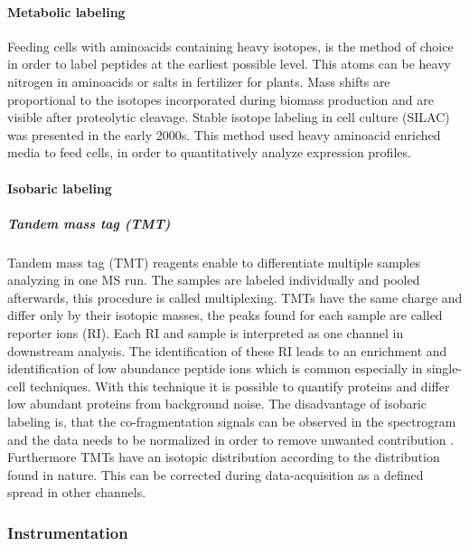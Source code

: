 \documentclass[
]{article}
\begin{document}
\hypertarget{metabolic-labeling}{%
\paragraph{Metabolic labeling}\label{metabolic-labeling}}

Feeding cells with aminoacids containing heavy isotopes, is the method
of choice in order to label peptides at the earliest possible level.
This atoms can be heavy nitrogen in aminoacids or salts in fertilizer
for plants. Mass shifts are proportional to the isotopes incorporated
during biomass production and are visible after proteolytic cleavage.
Stable isotope labeling in cell culture (SILAC) was presented in the
early 2000s. This method used heavy aminoacid enriched media to feed
cells, in order to quantitatively analyze expression profiles.

\hypertarget{isobaric-labeling}{%
\paragraph{Isobaric labeling}\label{isobaric-labeling}}

\hypertarget{tandem-mass-tag-tmt}{%
\subparagraph{Tandem mass tag (TMT)}\label{tandem-mass-tag-tmt}}

Tandem mass tag (TMT) reagents enable to differentiate multiple samples
analyzing in one MS run. The samples are labeled individually and pooled
afterwards, this procedure is called multiplexing. TMTs have the same
charge and differ only by their isotopic masses, the peaks found for
each sample are called reporter ions (RI). Each RI and sample is
interpreted as one channel in downstream analysis. The identification of
these RI leads to an enrichment and identification of low abundance
peptide ions which is common especially in single-cell techniques. With
this technique it is possible to quantify proteins and differ low
abundant proteins from background noise. The disadvantage of isobaric
labeling is, that the co-fragmentation signals can be observed in the
spectrogram and the data needs to be normalized in order to remove
unwanted contribution \citep{Marx2019, Budnik2018}. Furthermore TMTs
have an isotopic distribution according to the distribution found in
nature. This can be corrected during data-acquisition as a defined
spread in other channels.

\hypertarget{instrumentation}{%
\subsubsection{Instrumentation}\label{instrumentation}}
\end{document}

